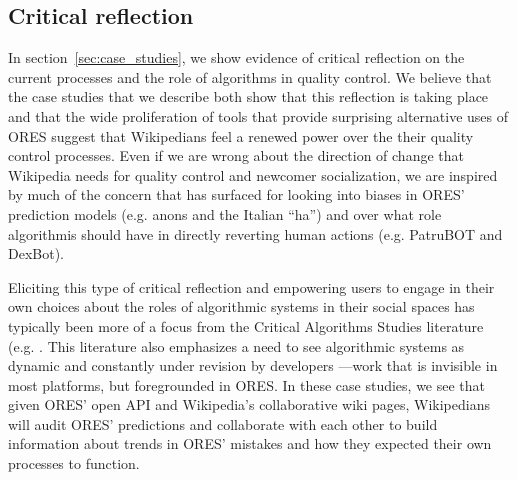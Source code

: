 \subsection{Critical reflection}
In section~\ref{sec:case_studies}, we show evidence of critical reflection on the current processes and the role of algorithms in quality control.  We believe that the case studies that we describe both show that this reflection is taking place and that the wide proliferation of tools that provide surprising alternative uses of ORES suggest that Wikipedians feel a renewed power over the their quality control processes.  Even if we are wrong about the direction of change that Wikipedia needs for quality control and newcomer socialization, we are inspired by much of the concern that has surfaced for looking into biases in ORES' prediction models (e.g. anons and the Italian ``ha'') and over what role algorithmis should have in directly reverting human actions (e.g. PatruBOT and DexBot).

Eliciting this type of critical reflection and empowering users to engage in their own choices about the roles of algorithmic systems in their social spaces has typically been more of a focus from the Critical Algorithms Studies literature (e.g. \cite{barocas2013governing, kitchin2017thinking}. This literature also emphasizes a need to see algorithmic systems as dynamic and constantly under revision by developers \cite{seaver2017algorithms}---work that is invisible in most platforms, but foregrounded in ORES. In these case studies, we see that given ORES' open API and Wikipedia's collaborative wiki pages, Wikipedians will audit ORES' predictions and collaborate with each other to build information about trends in ORES' mistakes and how they expected their own processes to function.

